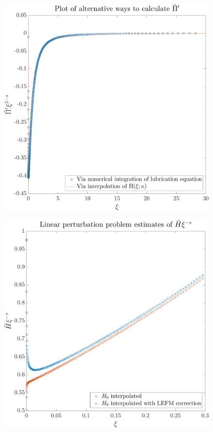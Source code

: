 \documentclass{article}
\begin{document}
\begin{figure}[!ht]\centering
\includegraphics[scale=0.3]{Pi-prime.pdf}
\end{figure}
\begin{figure}[!ht]\centering
\includegraphics[scale=0.3]{linear-perturbation.pdf}
\end{figure}
\end{document}
